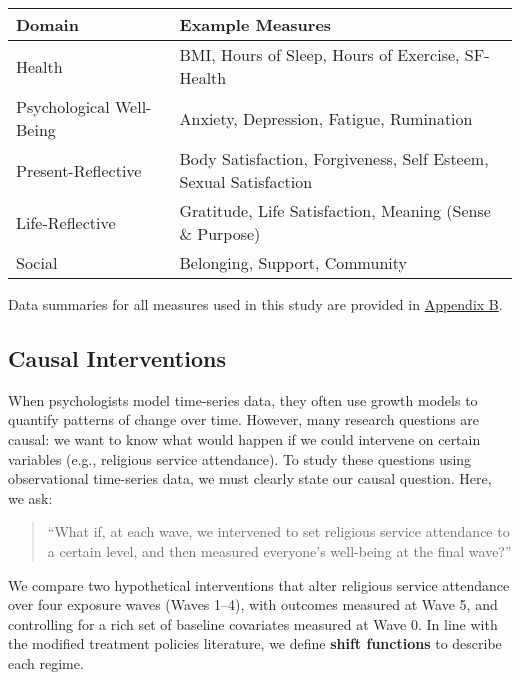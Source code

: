 \documentclass[
  single column]{article}
\begin{document}
\begin{longtable}[]{@{}
  >{\raggedright\arraybackslash}p{}
  >{\raggedright\arraybackslash}p{}@{}}
\toprule\noalign{}
\begin{minipage}[b]{\linewidth}\raggedright
Domain
\end{minipage} & \begin{minipage}[b]{\linewidth}\raggedright
Example Measures
\end{minipage} \\
\midrule\noalign{}
\endhead
\bottomrule\noalign{}
\endlastfoot
Health & BMI, Hours of Sleep, Hours of Exercise, SF-Health \\
Psychological Well-Being & Anxiety, Depression, Fatigue, Rumination \\
Present-Reflective & Body Satisfaction, Forgiveness, Self Esteem, Sexual
Satisfaction \\
Life-Reflective & Gratitude, Life Satisfaction, Meaning (Sense \&
Purpose) \\
Social & Belonging, Support, Community \\
\end{longtable}

Data summaries for all measures used in this study are provided in
\href{appendix-baseline}{Appendix B}.

\subsection{Causal Interventions}\label{causal-interventions}

When psychologists model time-series data, they often use growth models
to quantify patterns of change over time. However, many research
questions are causal: we want to know what would happen if we could
intervene on certain variables (e.g., religious service attendance). To
study these questions using observational time-series data, we must
clearly state our causal question. Here, we ask:

\begin{quote}
``What if, at each wave, we intervened to set religious service
attendance to a certain level, and then measured everyone's well-being
at the final wave?''
\end{quote}

We compare two hypothetical interventions that alter religious service
attendance over four exposure waves (Waves 1--4), with outcomes measured
at Wave 5, and controlling for a rich set of baseline covariates
measured at Wave 0. In line with the modified treatment policies
literature, we define \textbf{shift functions} to describe each regime.
\end{document}
